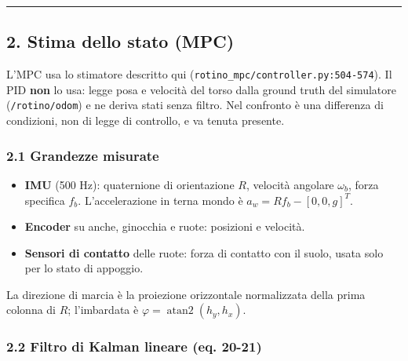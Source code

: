 \documentclass[
]{article}
\providecommand{\tightlist}{%
  \setlength{\itemsep}{0pt}\setlength{\parskip}{0pt}}
\begin{document}
\begin{center}\rule{0.5\linewidth}{0.5pt}\end{center}

\subsection{2. Stima dello stato (MPC)}\label{2-stima-dello-stato-mpc}

L'MPC usa lo stimatore descritto qui (\texttt{rotino\_mpc/controller.py:504-574}). Il PID \textbf{non} lo usa: legge posa e velocità del torso dalla ground truth del simulatore (\texttt{/rotino/odom}) e ne deriva stati senza filtro. Nel confronto è una differenza di condizioni, non di legge di controllo, e va tenuta presente.

\subsubsection{2.1 Grandezze misurate}\label{21-grandezze-misurate}

\begin{itemize}
\tightlist
\item \textbf{IMU} (500 Hz): quaternione di orientazione \(R\), velocità angolare \(\omega_b\), forza specifica \(f_b\). L'accelerazione in terna mondo è \(a_w = Rf_b - [0,0,g]^T\).
\item \textbf{Encoder} su anche, ginocchia e ruote: posizioni e velocità.
\item \textbf{Sensori di contatto} delle ruote: forza di contatto con il suolo, usata solo per lo stato di appoggio.
\end{itemize}

La direzione di marcia è la proiezione orizzontale normalizzata della prima colonna di \(R\); l'imbardata è \(\varphi = \operatorname{atan2}(h_y, h_x)\).

\subsubsection{2.2 Filtro di Kalman lineare (eq. 20-21)}\label{22-filtro-di-kalman-lineare-eq-20-21}
\end{document}
